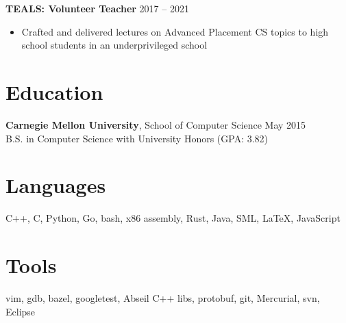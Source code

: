 \documentclass[margin]{res} \usepackage{hyperref}
\begin{document}
\begin{resume}
  \textbf{TEALS: Volunteer Teacher} \hfill 2017 -- 2021
  \begin{minipage}{0.84\textwidth}
    \vspace{0.2em}
    \begin{itemize} \itemsep -1pt
      \item Crafted and delivered lectures on Advanced Placement CS topics
        to high school students in an underprivileged school
    \end{itemize}
  \end{minipage}

\section{Education}
  \textbf{Carnegie Mellon University}, School of Computer Science
    \hfill May 2015\\
  B.S. in Computer Science with University Honors (GPA: 3.82)

\section{Languages}
  C++, C, Python, Go, bash, x86 assembly, Rust, Java, SML, \LaTeX, JavaScript

\section{Tools}
  vim, gdb, bazel, googletest, Abseil C++ libs, protobuf, git, Mercurial, svn, Eclipse

\end{resume}
\end{document}
